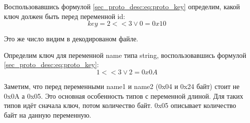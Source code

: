 Воспользовавшись формулой \eqref{sec_proto_desc:eq:proto_key} определим, какой ключ должен быть перед переменной id:
\begin{equation*}
    key = 2 << 3 \lor 0 = 0x10
\end{equation*}

Это же число видим в декодированом файле.

Определим ключ для переменной name типа string, воспользовавшись формулой \eqref{sec_proto_desc:eq:proto_key}: 
\begin{equation*}
    1 << 3 \lor 2 = 0x0A
\end{equation*}

Заметим, что перед переменными name1 и name2 (0x04 и 0x24 байт) стоит не 0x0A а 0x05. Это основная особенность типов с переменной длиной. Для таких типов идёт сначала ключ, потом количество байт. 0x05 описывает количество байт на данную переменную. 


